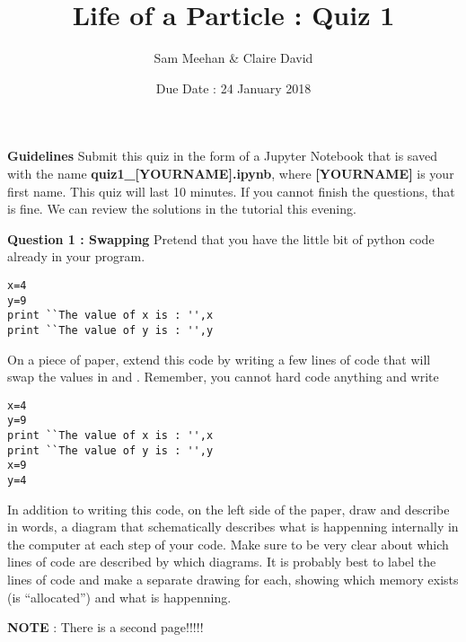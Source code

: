\documentclass[12pt]{article}
\title{Life of a Particle : Quiz 1}
\author{Sam Meehan \& Claire David}
\date{Due Date : 24 January 2018}
\begin{document}
\maketitle


\textbf{Guidelines} 
\newline
Submit this quiz in the form of a Jupyter Notebook that is saved with the name \textbf{quiz1\_[YOURNAME].ipynb}, where \textbf{[YOURNAME]} is your first name.
\newline
\newline
This quiz will last 10 minutes.  If you cannot finish the questions, that is fine.  We can review the solutions in the tutorial this evening.
\newline

\textbf{Question 1 : Swapping}
Pretend that you have the little bit of python code already in your program.
\begin{lstlisting}
x=4
y=9
print ``The value of x is : '',x
print ``The value of y is : '',y
\end{lstlisting}
On a piece of paper, extend this code by writing a few lines of code that will swap the values in \small{} and \small{}.  Remember, you cannot hard code anything and write
\begin{lstlisting}
x=4
y=9
print ``The value of x is : '',x
print ``The value of y is : '',y
x=9
y=4
\end{lstlisting}
In addition to writing this code, on the left side of the paper, draw and describe in words, a diagram that schematically describes what is happenning internally in the computer at each step of your code.  Make sure to be very clear about which lines of code are described by which diagrams.  It is probably best to label the lines of code and make a separate drawing for each, showing which memory exists (is ``allocated'') and what is happenning.
\newline
\newline

\begin{center}
\textbf{NOTE} : There is a second page!!!!!
\end{center}
\end{document}
